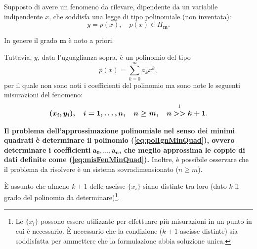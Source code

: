 Supposto di avere un fenomeno da rilevare, dipendente da un variabile indipendente $x$, che soddisfa una legge di tipo polinomiale (non inventata):
\begin{equation*}
    y=p(x),\quad p(x)\in\Pi_{\boldsymbol{m}}.
\end{equation*}

\begin{remark}
    In genere il grado $\boldsymbol m$ è noto a priori.
\end{remark}

Tuttavia, $y$, data l'uguaglianza sopra, è un polinomio del tipo
\begin{equation}\label{eq:polIgnMinQuad}
    p(x)=\sum_{k=0}^{m}a_kx^k,
\end{equation}
per il quale non sono noti i coefficienti del polinomio ma sono note le seguenti misurazioni del fenomeno:
\begin{equation}\label{eq:misFenMinQuad}
    \boldsymbol{(x_i,y_i),\quad i=1,\hdots,n,\quad n\geq m,\quad n}\overset{\footnotemark}{\boldsymbol{>>}}\boldsymbol{k+1}.
\end{equation}

\textbf{Il problema dell'approssimazione polinomiale nel senso dei minimi quadrati è determinare il polinomio (\ref{eq:polIgnMinQuad}), ovvero determinare i coefficienti} $\boldsymbol{a_0,\hdots, a_n}$\textbf{, che meglio approssima le coppie di dati definite come (\ref{eq:misFenMinQuad}).} Inoltre, è possibile osservare che il problema da risolvere è un sistema sovradimensionato ($n\geq m$).

\begin{remark}\label{re:ascDistPolm}
     È assunto che almeno $k+1$ delle ascisse $\{x_i\}$ siano distinte tra loro (dato $k$ il grado del polinomio da determinare)\footnote{Le $\{x_i\}$ possono essere utilizzate per effettuare più misurazioni in un punto in cui è necessario. È necessario che la condizione ($k+1$ ascisse distinte) sia soddisfatta per ammettere che la formulazione abbia soluzione unica.}.
\end{remark}

